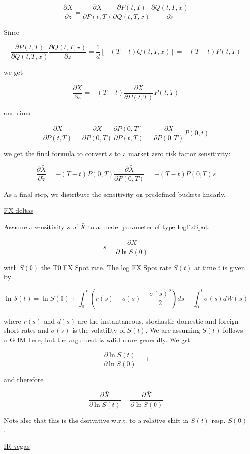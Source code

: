 $$
\frac{\partial \bar{X}}{\partial{\tilde{z}}} = \frac{\partial \bar{X}}{\partial P(t,T)} \frac{\partial P(t,T)}{\partial Q(t,T,x)} \frac{\partial Q(t,T,x)}{\partial \tilde{z}}
$$

Since

$$
\frac{\partial P(t,T)}{\partial Q(t,T,x)} \frac{\partial Q(t,T,x)}{\partial \tilde{z}} = \frac{1}{d} \left[ -(T-t) Q(t,T,x) \right] = -(T-t)P(t,T)
$$

we get

$$
\frac{\partial \bar{X}}{\partial{\tilde{z}}} = -(T-t) \frac{\partial \bar{X}}{\partial P(t,T)} P(t,T)
$$

and since

$$
\frac{\partial \bar{X}}{\partial P(t,T)} = \frac{\partial \bar{X}}{\partial P(0,T)} \frac{\partial P(0,T)}{\partial P(t,T)} =  \frac{\partial \bar{X}}{\partial P(0,T)} P(0,t)
$$

we get the final formula to convert $s$ to a market zero risk factor sensitivity:

$$
\frac{\partial \bar{X}}{\partial{\tilde{z}}} = -(T-t) P(0,T) \frac{\partial \bar{X}}{\partial P(0,T)} = -(T-t) P(0,T) s
$$

As a final step, we distribute the sensitivity on predefined buckets linearly.

\underline{FX deltas}

Assume a sensitivity $s$ of $\bar{X}$ to a model parameter of type logFxSpot:

$$
s = \frac{\partial\bar{X}}{\partial \ln S(0)}
$$

with $S(0)$ the T0 FX Spot rate. The log FX Spot rate $S(t)$ at time $t$ is given by

$$
\ln S(t) = \ln S(0) + \int_0^t \left( r(s) - d(s) - \frac{\sigma(s)^2}{2} \right) ds + \int_0^t \sigma(s) dW(s)
$$

where $r(s)$ and $d(s)$ are the instantaneous, stochastic domestic and foreign short rates and $\sigma(s)$ is the
volatility of $S(t)$. We are assuming $S(t)$ follows a GBM here, but the argument is valid more generally. We get

$$
\frac{\partial \ln S(t)}{\partial \ln S(0)} = 1
$$

and therefore

$$
\frac{\partial \bar{X}}{\partial \ln S(t)} = \frac{\partial \bar{X}}{\partial \ln S(0)}
$$

Note also that this is the derivative w.r.t. to a relative shift in $S(t)$ resp. $S(0)$.

\underline{IR vegas}


